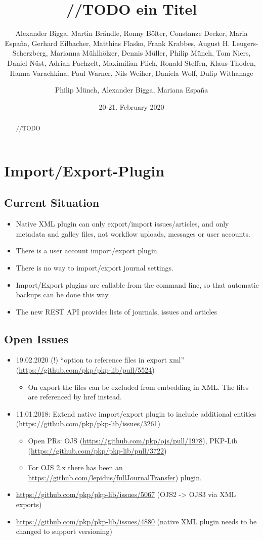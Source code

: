 \documentclass{article}
\title{//TODO ein Titel}
\author[1]{Alexander Bigga, Martin Brändle, Ronny Bölter, Constanze	Decker, Maria España, Gerhard Eilbacher, Matthias Flasko, Frank Krabbes, August H. Leugers-Scherzberg, Marianna Mühlhölzer, Dennis	Müller, Philip	Münch, Tom	Niers, Daniel Nüst, Adrian	Pachzelt,  Maximilian Plich, Ronald	Steffen, Klaus 	Thoden, Hanna Varachkina, Paul Warner, Nils Weiher, Daniela	Wolf, Dulip	Withanage}
\date{20-21. February 2020}
\begin{document}
\maketitle

\begin{abstract}
    //TODO 
\end{abstract}
\tableofcontents
\newpage


\section{Import/Export-Plugin}
\author{Philip Münch, Alexander Bigga, Mariana España}

\subsection{Current Situation}

\begin{itemize}
    \item Native XML plugin can only export/import issues/articles, and only metadata and galley files, not workflow uploads, messages or user accounts.
    \item There is a user account import/export plugin.
    \item There is no way to import/export journal settings.
    \item Import/Export plugins are callable from the command line, so that automatic backups can be done this way.
   \item The new REST API provides lists of journals, issues and articles
\end{itemize}

\subsection{Open Issues}

\begin{itemize}
\item 19.02.2020 (!) “option to reference files in export xml” (\url{https://github.com/pkp/pkp-lib/pull/5524})
\begin{itemize}
\item On export the files can be excluded from embedding in XML. The files are referenced by href instead.
\end{itemize} 
\item 11.01.2018: Extend native import/export plugin to include additional entities (\url{https://github.com/pkp/pkp-lib/issues/3261})
\begin{itemize}
\item Open PRs: OJS (\url{https://github.com/pkp/ojs/pull/1978}), PKP-Lib (\url{https://github.com/pkp/pkp-lib/pull/3722})
\item For OJS 2.x there has been an \url{https://github.com/lepidus/fullJournalTransfer}) plugin.
\end{itemize} 
\item \url{https://github.com/pkp/pkp-lib/issues/5067} (OJS2 -> OJS3 via XML exports)
\item \url{https://github.com/pkp/pkp-lib/issues/4880} (native XML plugin needs to be changed to support versioning)
\end{itemize} 
\end{document}
